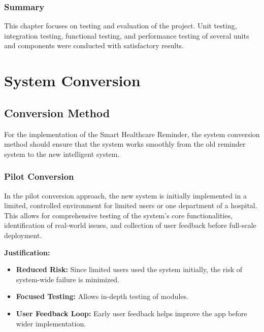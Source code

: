 \documentclass[12pt, a4paper, oneside]{report}
\begin{document}


\subsection*{Summary}
This chapter focuses on testing and evaluation of the project. Unit testing, integration testing, functional testing, and performance testing of several units and components were conducted with satisfactory results.

\chapter{System Conversion}
\label{ch:conversion}

\section{Conversion Method}

For the implementation of the Smart Healthcare Reminder, the system conversion method should ensure that the system works smoothly from the old reminder system to the new intelligent system.

\subsection{Pilot Conversion}
In the pilot conversion approach, the new system is initially implemented in a limited, controlled environment for limited users or one department of a hospital. This allows for comprehensive testing of the system's core functionalities, identification of real-world issues, and collection of user feedback before full-scale deployment.

\textbf{Justification:}
\begin{itemize}
    \item \textbf{Reduced Risk:} Since limited users used the system initially, the risk of system-wide failure is minimized.
    \item \textbf{Focused Testing:} Allows in-depth testing of modules.
    \item \textbf{User Feedback Loop:} Early user feedback helps improve the app before wider implementation.
\end{itemize}
\end{document}
